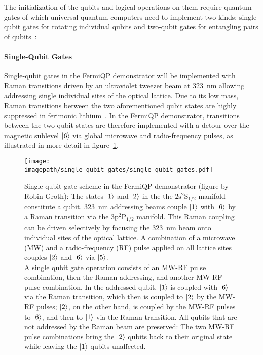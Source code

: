 The initialization of the qubits and logical operations on them require quantum gates of which universal quantum computers need to implement two kinds: single-qubit gates for rotating individual qubits and two-qubit gates for entangling pairs of qubits~\cite{nielsen_quantum_2010, hidary_quantum_2021, ladd_quantum_2010, mainzer_quantencomputer_2020}:

\paragraph*{Single-Qubit Gates}
Single-qubit gates in the FermiQP demonstrator will be implemented with Raman transitions driven by an ultraviolet tweezer beam at \SI[]{323}{\nano\meter} allowing addressing single individual sites of the optical lattice. Due to its low mass, Raman transitions between the two aforementioned qubit states are highly suppressed in  ferimonic lithium~\cite{wei_magnetic-field_2013}. In the FermiQP demonstrator, transitions between the two qubit states are therefore implemented with a detour over the magnetic sublevel $\Ket{6}$ via global microwave and radio-frequency pulses, as illustrated in more detail in figure~\ref{fig:single_qubit_gates}.

\begin{figure}
    \centering
    \texttt{[image: \\imagepath/single\_qubit\_gates/single\_qubit\_gates.pdf]}
    \caption{Single qubit gate scheme in the FermiQP demonstrator (figure by Robin Groth): The states $\Ket{1}$ and $\Ket{2}$ in the the $2\text{s} ^2\text{S}_{1/2}$ manifold constitute a qubit.
    \SI[]{323}{\nano\meter} addressing beams couple $\Ket{1}$ with $\Ket{6}$ by a Raman transition via the $3\text{p} ^2\text{P}_{1/2}$ manifold. This Raman coupling can be driven selectively by focusing the \SI[]{323}{\nano\meter} beam onto individual sites of the optical lattice.
    A combination of a microwave (MW) and a radio-frequency (RF) pulse applied on all lattice sites couples $\Ket{2}$ and $\Ket{6}$ via $\Ket{5}$.\\
    A single qubit gate operation consists of an MW-RF pulse combination, then the Raman addressing, and another MW-RF pulse combination.
    In the addressed qubit, $\Ket{1}$ is coupled with $\Ket{6}$ via the Raman transition, which then is coupled to $\Ket{2}$ by the MW-RF pulses; $\Ket{2}$, on the other hand, is coupled by the MW-RF pulses to $\Ket{6}$, and then to $\Ket{1}$ via the Raman transition.
    All qubits that are not addressed by the Raman beam are preserved: The two MW-RF pulse combinations bring the $\Ket{2}$ qubits back to their original state while leaving the $\Ket{1}$ qubits unaffected.}
    \label{fig:single_qubit_gates}
\end{figure}

